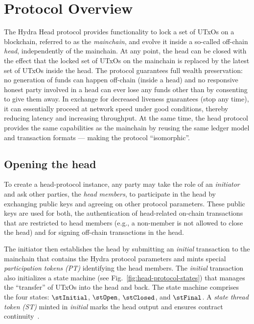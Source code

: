 \section{Protocol Overview}\label{sec:overview}

The Hydra Head protocol provides functionality to lock a set of UTxOs on a
blockchain, referred to as the \emph{mainchain}, and evolve it inside a
so-called off-chain \emph{head}, independently of the mainchain. At any point,
the head can be closed with the effect that the locked set of UTxOs on the
mainchain is replaced by the latest set of UTxOs inside the head. The protocol
guarantees full wealth preservation: no generation of funds can happen off-chain
(inside a head) and no responsive honest party involved in a head can ever lose
any funds other than by consenting to give them away. In exchange for decreased
liveness guarantees (stop any time), it can essentially proceed at network speed
under good conditions, thereby reducing latency and increasing throughput. At
the same time, the head protocol provides the same capabilities as the mainchain
by reusing the same ledger model and transaction formats --- making the protocol
``isomorphic''.

\subsection{Opening the head}

To create a head-protocol instance, any party may take the role of an
\emph{initiator} and ask other parties, the \emph{head members}, to participate
in the head by exchanging public keys and agreeing on other protocol parameters.
These public keys are used for both, the authentication of head-related on-chain
transactions that are restricted to head members (e.g., a non-member is not
allowed to close the head) and for signing off-chain transactions in the head.

The initiator then establishes the head by submitting an \emph{initial}
transaction to the mainchain that contains the Hydra protocol parameters and
mints special \emph{participation tokens (PT)} identifying the head members. The
\emph{initial} transaction also initializes a state machine (see
Fig.~\ref{fig:head-protocol-states}) that manages the ``transfer'' of UTxOs into
the head and back. The state machine comprises the four states: $\stInitial$,
$\stOpen$, $\stClosed$, and $\stFinal$. A \emph{state thread token (ST)} minted
in \emph{initial} marks the head output and ensures contract
continuity~\cite{eutxo}.

